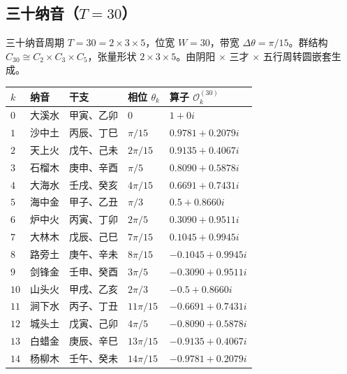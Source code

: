 \subsection{\texorpdfstring{三十纳音（$T=30$）}{三十纳音（T=30）}}

\begin{definition}[三十纳音相位算子]\label{def:nayin_operators}
三十纳音周期 $T=30=2 \times 3 \times 5$，位宽 $W=30$，带宽 $\Delta\theta=\pi/15$。群结构 $C_{30} \cong C_2 \times C_3 \times C_5$，张量形状 $2 \times 3 \times 5$。由阴阳 $\times$ 三才 $\times$ 五行周转圆嵌套生成。
\end{definition}

\begin{center}
\begin{tabular}{>{\centering\arraybackslash}p{1cm}>{\centering\arraybackslash}p{2.5cm}>{\centering\arraybackslash}p{3cm}>{\centering\arraybackslash}p{2cm}>{\centering\arraybackslash}p{3.5cm}}
\toprule
$k$ & 纳音 & 干支 & 相位 $\theta_k$ & 算子 $\mathcal{O}_k^{(30)}$ \\
\midrule
$0$  & 大溪水   & 甲寅、乙卯 & $0$ & $1+0i$ \\
$1$  & 沙中土   & 丙辰、丁巳 & $\pi/15$ & $0.9781+0.2079i$ \\
$2$  & 天上火   & 戊午、己未 & $2\pi/15$ & $0.9135+0.4067i$ \\
$3$  & 石榴木   & 庚申、辛酉 & $\pi/5$ & $0.8090+0.5878i$ \\
$4$  & 大海水   & 壬戌、癸亥 & $4\pi/15$ & $0.6691+0.7431i$ \\
$5$  & 海中金   & 甲子、乙丑 & $\pi/3$ & $0.5+0.8660i$ \\
$6$  & 炉中火   & 丙寅、丁卯 & $2\pi/5$ & $0.3090+0.9511i$ \\
$7$  & 大林木   & 戊辰、己巳 & $7\pi/15$ & $0.1045+0.9945i$ \\
$8$  & 路旁土   & 庚午、辛未 & $8\pi/15$ & $-0.1045+0.9945i$ \\
$9$  & 剑锋金   & 壬申、癸酉 & $3\pi/5$ & $-0.3090+0.9511i$ \\
$10$ & 山头火   & 甲戌、乙亥 & $2\pi/3$ & $-0.5+0.8660i$ \\
$11$ & 涧下水   & 丙子、丁丑 & $11\pi/15$ & $-0.6691+0.7431i$ \\
$12$ & 城头土   & 戊寅、己卯 & $4\pi/5$ & $-0.8090+0.5878i$ \\
$13$ & 白蜡金   & 庚辰、辛巳 & $13\pi/15$ & $-0.9135+0.4067i$ \\
$14$ & 杨柳木   & 壬午、癸未 & $14\pi/15$ & $-0.9781+0.2079i$ \\

\end{tabular}
\end{center}
